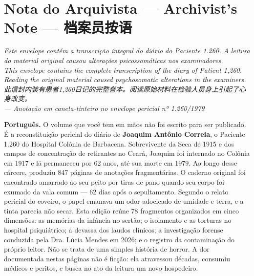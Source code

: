 \cleardoublepage
\thispagestyle{empty}
\chapter*{Nota do Arquivista --- Archivist's Note --- 档案员按语}

\begin{center}
\itshape\small
Este envelope contém a transcrição integral do diário do Paciente 1.260. A leitura do material original causou alterações psicossomáticas nos examinadores.\\[0.3em]
This envelope contains the complete transcription of the diary of Patient 1,260. Reading the original material caused psychosomatic alterations in the examiners.\\[0.3em]
此信封内装有患者1,260日记的完整誊本。阅读原始材料在检验人员身上引起了心身改变。\\[0.5em]
\upshape\scriptsize --- Anotação em caneta-tinteiro no envelope pericial nº 1.260/1979
\end{center}

\vspace{1.2em}

\begingroup

\noindent\textbf{Português.} O volume que você tem em mãos não foi escrito para ser publicado. É a reconstituição pericial do diário de \textbf{Joaquim Antônio Correia}, o Paciente 1.260 do Hospital Colônia de Barbacena. Sobrevivente da Seca de 1915 e dos campos de concentração de retirantes no Ceará, Joaquim foi internado no Colônia em 1917 e lá permaneceu por 62 anos, até sua morte em 1979. Ao longo desse cárcere, produziu 847 páginas de anotações fragmentárias. O caderno original foi encontrado amarrado ao seu peito por tiras de pano quando seu corpo foi exumado da vala comum --- 62 dias após o sepultamento. Segundo o relato pericial do coveiro, o papel emanava um odor adocicado de umidade e terra, e a tinta parecia não secar. Esta edição reúne 78 fragmentos organizados em cinco dimensões: as memórias da infância no sertão; o isolamento e as torturas no hospital psiquiátrico; a devassa dos laudos clínicos; a investigação forense conduzida pela Dra. Lúcia Mendes em 2026; e o registro da contaminação do próprio leitor. Não se trata de uma simples história de horror. A dor documentada nestas páginas não é ficção: ela atravessou décadas, consumiu médicos e peritos, e busca no ato da leitura um novo hospedeiro.

